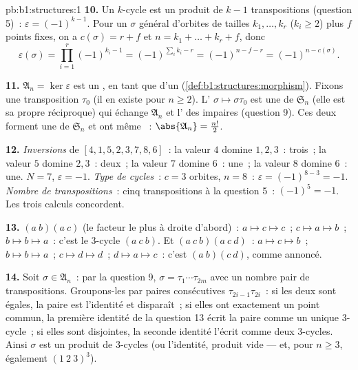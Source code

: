 \begin{solution}{pb:b1:structures:1}
\textbf{10.} Un $k$-cycle est un produit de $k - 1$ transpositions
(question 5)~: $\varepsilon = (-1)^{k-1}$. Pour un $\sigma$ général
d'orbites de tailles $k_1, \dots, k_r$ ($k_i \geq 2$) plus $f$ points
fixes, on a $c(\sigma) = r + f$ et $n = k_1 + \dots + k_r + f$, donc
\[
\varepsilon(\sigma) = \prod_{i=1}^r (-1)^{k_i - 1}
= (-1)^{\sum_i k_i - r} = (-1)^{n - f - r} = (-1)^{n -
c(\sigma)} .
\]

\textbf{11.} $\mathfrak A_n = \ker\varepsilon$ est un , en
tant que  d'un  (\cref{def:b1:structures:morphism}).
Fixons une transposition $\tau_0$ (il en existe pour $n \geq 2$).
L' $\sigma \mapsto \sigma\tau_0$ est une  de
$\mathfrak S_n$ (elle est sa propre réciproque) qui échange
$\mathfrak A_n$ et l' des  impaires (question 9).
Ces deux  forment une  de $\mathfrak S_n$ et ont même
~: $\abs{\mathfrak A_n} = \frac{n!}2$.

\textbf{12.} \emph{Inversions} de $[4, 1, 5, 2, 3, 7, 8, 6]$~: la
valeur $4$ domine $1, 2, 3$~: trois~; la valeur $5$ domine $2, 3$~:
deux~; la valeur $7$ domine $6$~: une~; la valeur $8$ domine $6$~: une.
$N = 7$, $\varepsilon = -1$. \emph{Type de cycles}~: $c = 3$ orbites,
$n = 8$~: $\varepsilon = (-1)^{8-3} = -1$. \emph{Nombre de
transpositions}~: cinq transpositions à la question 5~: $(-1)^5 = -1$.
Les trois calculs concordent.

\textbf{13.} $(a\ b)(a\ c)$ (le facteur le plus à droite d'abord)~: $a
\mapsto c \mapsto c$~; $c \mapsto a \mapsto b$~; $b \mapsto b \mapsto
a$~: c'est le $3$-cycle $(a\ c\ b)$. Et $(a\ c\ b)(a\ c\ d)$~: $a
\mapsto c \mapsto b$~; $b \mapsto b \mapsto a$~; $c \mapsto d \mapsto
d$~; $d \mapsto a \mapsto c$~: c'est $(a\ b)(c\ d)$, comme annoncé.

\textbf{14.} Soit $\sigma \in \mathfrak A_n$~: par la question 9,
$\sigma = \tau_1\cdots\tau_{2m}$ avec un nombre pair de
transpositions. Groupons-les par paires consécutives
$\tau_{2i-1}\tau_{2i}$~: si les deux sont égales, la paire est
l'identité et disparaît~; si elles ont exactement un point commun, la
première identité de la question 13 écrit la paire comme un unique
$3$-cycle~; si elles sont disjointes, la seconde identité l'écrit
comme deux $3$-cycles. Ainsi $\sigma$ est un produit de $3$-cycles (ou
l'identité, produit vide --- et, pour $n \geq 3$, également
$(1\ 2\ 3)^3$).


\end{solution}
